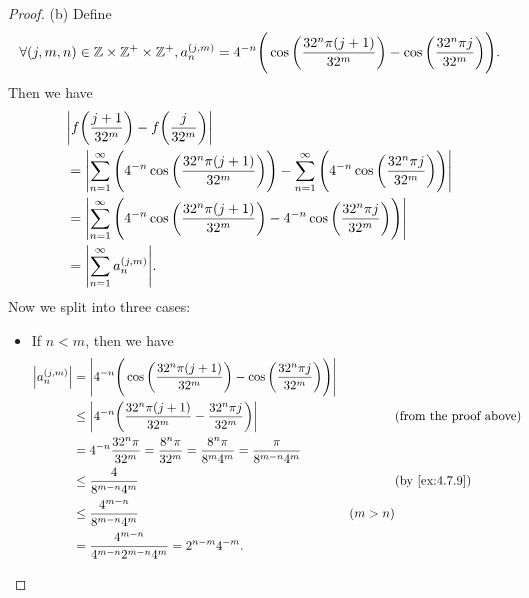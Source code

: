 \begin{proof}{(b)}
  Define
  \[
    \forall (j, m, n) \in \mathbb{Z} \times \mathbb{Z}^+ \times \mathbb{Z}^+, a_n^{(j, m)} = 4^{-n} \Bigg(\cos\bigg(\dfrac{32^n \pi (j + 1)}{32^m}\bigg) - \cos\bigg(\dfrac{32^n \pi j}{32^m}\bigg)\Bigg).
  \]
  Then we have
  \begin{align*}
     & \abs{f\bigg(\dfrac{j + 1}{32^m}\bigg) - f\bigg(\dfrac{j}{32^m}\bigg)}                                                                                                           \\
     & = \abs{\sum_{n = 1}^\infty \Bigg(4^{-n} \cos\bigg(\dfrac{32^n \pi (j + 1)}{32^m}\bigg)\Bigg) - \sum_{n = 1}^\infty \Bigg(4^{-n} \cos\bigg(\dfrac{32^n \pi j}{32^m}\bigg)\Bigg)} \\
     & = \abs{\sum_{n = 1}^\infty \Bigg(4^{-n} \cos\bigg(\dfrac{32^n \pi (j + 1)}{32^m}\bigg) - 4^{-n} \cos\bigg(\dfrac{32^n \pi j}{32^m}\bigg)\Bigg)}                                 \\
     & = \abs{\sum_{n = 1}^\infty a_n^{(j, m)}}.
  \end{align*}
  Now we split into three cases:
  \begin{itemize}
    \item If \(n < m\), then we have
          \begin{align*}
            \abs{a_n^{(j, m)}} & = \abs{4^{-n} \Bigg(\cos\bigg(\dfrac{32^n \pi (j + 1)}{32^m}\bigg) - \cos\bigg(\dfrac{32^n \pi j}{32^m}\bigg)\Bigg)}                                           \\
                               & \leq \abs{4^{-n} \bigg(\dfrac{32^n \pi (j + 1)}{32^m} - \dfrac{32^n \pi j}{32^m}\bigg)}                              &         & \text{(from the proof above)} \\
                               & = 4^{-n} \dfrac{32^n \pi}{32^m} = \dfrac{8^n \pi}{32^m} = \dfrac{8^n \pi}{8^m 4^m} = \dfrac{\pi}{8^{m - n} 4^m}                                                \\
                               & \leq \dfrac{4}{8^{m - n} 4^m}                                                                                        &         & \by{ex:4.7.9}                 \\
                               & \leq \dfrac{4^{m - n}}{8^{m - n} 4^m}                                                                                & (m > n)                                 \\
                               & = \dfrac{4^{m - n}}{4^{m - n} 2^{m - n} 4^m} = 2^{n - m} 4^{-m}.
          \end{align*}

\end{itemize}
\end{proof}
